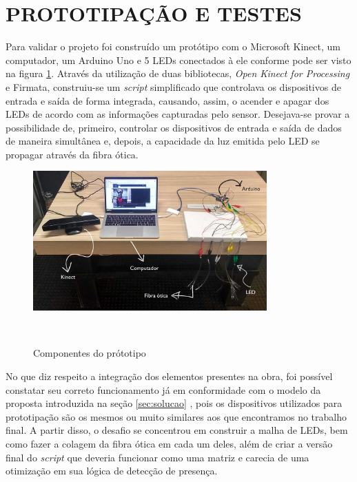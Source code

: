 \section{PROTOTIPAÇÃO E TESTES}

Para validar o projeto foi construído um protótipo com o Microsoft Kinect, um computador, um Arduino Uno e 5 LEDs conectados à ele conforme pode ser visto na figura \ref{fig:prototipo}. Através da utilização de duas bibliotecas, \textit{Open Kinect for Processing} e Firmata, construiu-se um \textit{script} simplificado que controlava os dispositivos de entrada e saída de forma integrada, causando, assim, o acender e apagar dos LEDs de acordo com as informações capturadas pelo sensor. Desejava-se provar a possibilidade de, primeiro, controlar os dispositivos de entrada e saída de dados de maneira simultânea e, depois, a capacidade da luz emitida pelo LED se propagar através da fibra ótica.

\begin{figure}[H]
  \begin{center}
    \caption{Componentes do prótotipo}
    \vspace*{0,2cm}
    \includegraphics[width=0.8\textwidth]{./04-figuras/prototipo}
    \label{fig:prototipo}
  \end{center}
  \vspace*{-0,9cm}
  \\
\end{figure}

No que diz respeito a integração dos elementos presentes na obra, foi possível constatar seu correto funcionamento já em conformidade com o modelo da proposta introduzida na seção \ref{sec:solucao} , pois os dispositivos utilizados para prototipação são os mesmos ou muito similares aos que encontramos no trabalho final. A partir disso, o desafio se concentrou em construir a malha de LEDs, bem como fazer a colagem da fibra ótica em cada um deles, além de criar a versão final do \textit{script} que deveria funcionar como uma matriz e carecia de uma otimização em sua lógica de detecção de presença.

